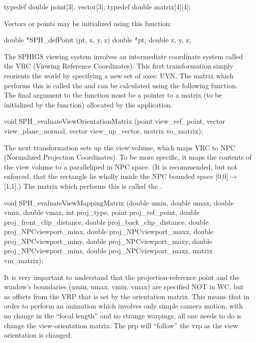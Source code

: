 \begincode
typedef double point[3], vector[3];
typedef double matrix[4][4];
\endcode

\newpar
Vectors or points may be initialized using this function:

\begincode
double *SPH_defPoint (pt,  x, y, z)
double *pt;    
double x, y, z;
\endcode


The SPHIGS viewing system involves an intermediate coordinate system called the
VRC (Viewing Reference Coordinates).  This first transformation simply
reorients the world by specifying a new set of axes: UVN.  The matrix which
performs this is called the  and can be
calculated using the following function.  The final argument to the function
must be a pointer to a matrix (to be initialized by the function) allocated by
the application.

\begincode
void
SPH_evaluateViewOrientationMatrix
   (point view_ref_point, vector view_plane_normal, vector view_up_vector,
    matrix vo_matrix);
\endcode

\newpar
The next transformation sets up the view volume, which maps VRC to NPC
(Normalized Projection Coordinates).  To be more specific, it maps the contents
of the view volume to a paralleliped in NPC space.  (It is recommended, but not
enforced, that the rectangle lie wholly inside the NPC bounded space
[0,0]$\rightarrow$[1,1].)  The matrix which performs this is called the
.

\begincode
void 
SPH_evaluateViewMappingMatrix
   (double umin, double umax, 
    double vmin, double vmax,   
    int proj_type,        
    point proj_ref_point,   
    double proj_front_clip_distance,
       double proj_back_clip_distance,  
    double proj_NPCviewport_minx, double proj_NPCviewport_maxx,
    double proj_NPCviewport_miny, double proj_NPCviewport_maxy,
    double proj_NPCviewport_minz, double proj_NPCviewport_maxz,
    matrix vm_matrix);
\endcode

\newpar
It is very important to understand that the projection-reference point and the
window's boundaries (umin, umax, vmin, vmax) are specified NOT in WC, but as
offsets from the VRP that is set by the orientation matrix.  This means that in
order to perform an animation which involves only simple camera motion, with no
change in the ``focal length'' and no strange warpings, all one needs to do is
change the view-orientation matrix.  The prp will ``follow'' the vrp as the
view orientation is changed.

